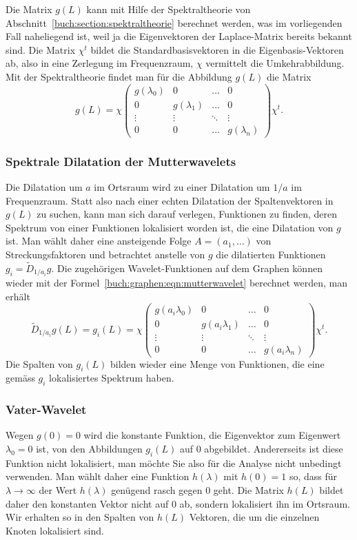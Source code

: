 Die Matrix $g(L)$ kann mit Hilfe der Spektraltheorie
von Abschnitt~\ref{buch:section:spektraltheorie}
berechnet werden,
was im vorliegenden Fall naheliegend ist, weil ja die Eigenvektoren 
der Laplace-Matrix bereits bekannt sind.
Die Matrix $\chi^t$ bildet die Standardbasisvektoren in die
Eigenbasis-Vektoren ab, also in eine Zerlegung im Frequenzraum,
$\chi$ vermittelt die Umkehrabbildung.
Mit der Spektraltheorie findet man für die Abbildung $g(L)$ die Matrix
\begin{equation}
g(L)
=
\chi
\begin{pmatrix}
g(\lambda_0)&0&\dots&0\\
0&g(\lambda_1)&\dots&0\\
\vdots&\vdots&\ddots&\vdots\\
0&0&\dots&g(\lambda_n)
\end{pmatrix}
\chi^t.
\label{buch:graphen:eqn:mutterwavelet}
\end{equation}

\subsubsection{Spektrale Dilatation der Mutterwavelets}
Die Dilatation um $a$ im Ortsraum wird zu einer Dilatation um $1/a$ im
Frequenzraum.
Statt also nach einer echten Dilatation der Spaltenvektoren in $g(L)$
zu suchen, kann man sich darauf verlegen, Funktionen zu finden, deren
Spektrum von einer Funktionen lokalisiert worden ist, die eine Dilatation
von $g$ ist.
Man wählt daher eine ansteigende Folge $A=(a_1,\dots)$ von Streckungsfaktoren
und betrachtet anstelle von $g$ die dilatierten Funktionen
$g_i=\tilde{D}_{1/a_i}g$.
Die zugehörigen Wavelet-Funktionen auf dem Graphen können wieder mit
der Formel~\eqref{buch:graphen:eqn:mutterwavelet} berechnet werden,
man erhält
\begin{equation}
\tilde{D}_{1/a_i}g(L)
=
g_i(L)
=
\chi
\begin{pmatrix}
g(a_i\lambda_0)&0&\dots&0\\
0&g(a_i\lambda_1)&\dots&0\\
\vdots&\vdots&\ddots&\vdots\\
0&0&\dots&g(a_i\lambda_n)
\end{pmatrix}
\chi^t .
\end{equation}
Die Spalten von $g_i(L)$ bilden wieder eine Menge von Funktionen, die
eine gemäss $g_i$ lokalisiertes Spektrum haben.

\subsubsection{Vater-Wavelet}
Wegen $g(0)=0$ wird die konstante Funktion, die Eigenvektor zum Eigenwert
$\lambda_0=0$ ist, von den Abbildungen $g_i(L)$ auf $0$ abgebildet.
Andererseits ist diese Funktion nicht lokalisiert, man möchte Sie also
für die Analyse nicht unbedingt verwenden.
Man wählt daher eine Funktion $h(\lambda)$ mit $h(0)=1$ so, dass
für $\lambda\to \infty$ der Wert $h(\lambda)$ genügend rasch gegen $0$
geht.
Die Matrix $h(L)$ bildet daher den konstanten Vektor nicht auf $0$ ab,
sondern lokalisiert ihn im Ortsraum.
Wir erhalten so in den Spalten von $h(L)$ Vektoren, die um die
einzelnen Knoten lokalisiert sind.


